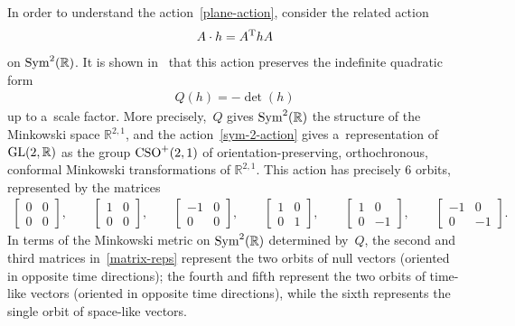 \documentclass[pdftex]{sigma}
\numberwithin{equation}{section}
\theoremstyle{definition}
\begin{document}
In order to understand the action~\eqref{plane-action}, consider the related action
\begin{gather}
A\cdot h = A^{\rm T} h A
\label{sym-2-action}
\end{gather}
on ${\rm Sym}^2(\mathbb{R})$.
It is shown in~\cite[p.~115]{MH73} that this action preserves the indef\/inite quadratic form
\begin{gather}
Q(h) = -\det(h)
\label{quadratic-form}
\end{gather}
up to a~scale factor.
More precisely,~$Q$ gives ${\rm Sym}^2(\mathbb{R})$ the structure of the Minkowski space $\mathbb{R}^{2,1}$, and the
action~\eqref{sym-2-action} gives a~representation of ${\rm GL}(2,\mathbb{R})$ as the group ${\rm CSO}^+(2,1)$ of
orientation-preserving, orthochronous, conformal Minkowski transformations of $\mathbb{R}^{2,1}$.
This action has precisely 6 orbits, represented by the matrices
\begin{gather}
\label{matrix-reps}
\begin{bmatrix}
0 & 0
\\
0 & 0
\end{bmatrix},
\qquad
\begin{bmatrix}
1 & 0
\\
0 & 0
\end{bmatrix},
\qquad
\begin{bmatrix}
-1 & 0
\\
0 & 0
\end{bmatrix},
\qquad
\begin{bmatrix}
1 & 0
\\
0 & 1
\end{bmatrix},
\qquad
\begin{bmatrix}
1 & 0
\\
0 & -1
\end{bmatrix},
\qquad
\begin{bmatrix}
-1 & 0
\\
0 & -1
\end{bmatrix}.
\end{gather}
In terms of the Minkowski metric on ${\rm Sym}^2(\mathbb{R})$ determined by~$Q$, the second and third matrices
in~\eqref{matrix-reps} represent the two orbits of null vectors (oriented in opposite time directions); the fourth and
f\/ifth represent the two orbits of time-like vectors (oriented in opposite time directions), while the sixth represents
the single orbit of space-like vectors.
\end{document}
